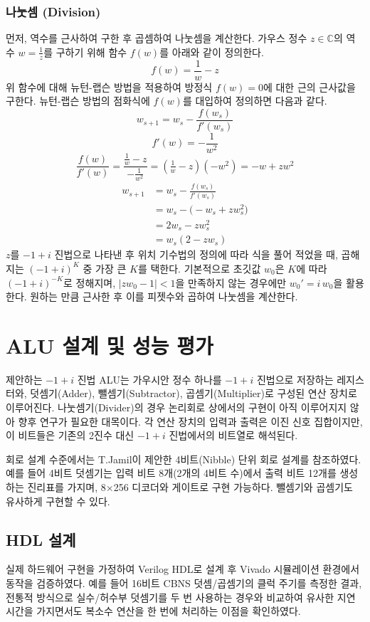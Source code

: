 \documentclass[10pt,a4paper,notitlepage]{report}
\begin{document}
\begin{multicols*}{2}
\subsubsection{나눗셈 (Division)}
먼저, 역수를 근사하여 구한 후 곱셈하여 나눗셈을 계산한다. 가우스 정수 $z \in \mathbb{C}$의 역수 $w=\frac{1}{z}$를 구하기 위해 함수 $f(w)$를 아래와 같이 정의한다.
$$
f(w) = \frac{1}{w} -z
$$
위 함수에 대해 뉴턴-랩슨 방법을 적용하여 방정식 $f(w)=0$에 대한 근의 근사값을 구한다. 뉴턴-랩슨 방법의 점화식에 $f(w)$를 대입하여 정의하면 다음과 같다.
$$
w_{s+1}=w_{s}-\frac{f(w_{s})}{f'(w_{s})}
$$
$$
f'(w)=-\dfrac{1}{w^2}
$$
$$
\frac{f(w)}{f'(w)}=\frac{\frac{1}{w}-z}{-\frac{1}{w^2}}=(\tfrac{1}{w}-z)(-w^2)=-w+z w^2
$$
\begin{align*}
w_{s+1} &= w_s - \frac{f(w_s)}{f'(w_s)} \\
        &= w_s - \big( -w_s + z w_s^2 \big) \\
        &= 2w_s - z w_s^2 \\
        &= w_s \left( 2 - z w_s \right)
\end{align*}
$z$를 $-1+i$ 진법으로 나타낸 후 위치 기수법의 정의에 따라 식을 풀어 적었을 때, 곱해지는 $(-1+i)^{K}$ 중 가장 큰 $K$를 택한다. 기본적으로 초깃값 $w_0$은 $K$에 따라 $(-1+i)^{-K}$로 정해지며, $|z w_0 - 1| < 1$을 만족하지 않는 경우에만 $w_0' = i\,w_0$을 활용한다.
원하는 만큼 근사한 후 이를 피젯수와 곱하여 나눗셈을 계산한다.

\section{ALU 설계 및 성능 평가}
제안하는 $-1 + i$ 진법 ALU는 가우시안 정수 하나를  $-1 + i$ 진법으로 저장하는 레지스터와, 덧셈기(Adder), 뺄셈기(Subtractor), 곱셈기(Multiplier)로 구성된 연산 장치로 이루어진다. 나눗셈기(Divider)의 경우 논리회로 상에서의 구현이 아직 이루어지지 않아 향후 연구가 필요한 대목이다. 각 연산 장치의 입력과 출력은 이진 신호 집합이지만, 이 비트들은 기존의 2진수 대신  $-1 + i$ 진법에서의 비트열로 해석된다.

회로 설계 수준에서는 T.Jamil이 제안한 4비트(Nibble) 단위 회로 설계를 참조하였다. 예를 들어 4비트 덧셈기는 입력 비트 8개(2개의 4비트 수)에서 출력 비트 12개를 생성하는 진리표를 가지며, 8×256 디코더와 게이트로 구현 가능하다. 뺄셈기와 곱셈기도 유사하게 구현할 수 있다.

\subsection{HDL 설계}
실제 하드웨어 구현을 가정하여 Verilog HDL로 설계 후 Vivado 시뮬레이션 환경에서 동작을 검증하였다. 예를 들어 16비트 CBNS 덧셈/곱셈기의 클럭 주기를 측정한 결과, 전통적 방식으로 실수/허수부 덧셈기를 두 번 사용하는 경우와 비교하여 유사한 지연 시간을 가지면서도 복소수 연산을 한 번에 처리하는 이점을 확인하였다.


\end{multicols*}
\end{document}
